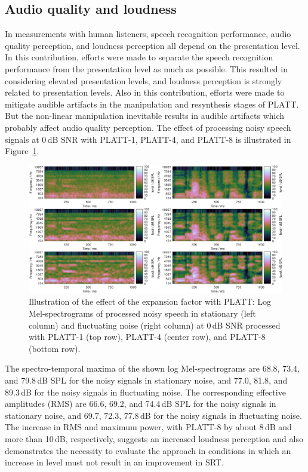 \documentclass[10pt,a4paper,twocolumn]{article}
\begin{document}
\subsection*{Audio quality and loudness}
%
In measurements with human listeners, speech recognition performance, audio quality perception, and loudness perception all depend on the presentation level.
%
In this contribution, efforts were made to separate the speech recognition performance from the presentation level as much as possible.
%
This resulted in considering elevated presentation levels, and loudness perception is strongly related to presentation levels.
%
Also in this contribution, efforts were made to mitigate audible artifacts in the manipulation and resynthesis stages of PLATT.
%
But the non-linear manipulation inevitable results in audible artifacts which probably affect audio quality perception.
%
The effect of processing noisy speech signals at 0\,dB SNR with PLATT-1, PLATT-4, and PLATT-8 is illustrated in Figure~\ref{fig:22}.
%
\begin{figure}[h!]
	\centerline{\includegraphics[width=1.0\textwidth]{images/signal-platt-processed}}
	\caption{Illustration of the effect of the expansion factor with PLATT: Log Mel-spectrograms of processed noisy speech in stationary (left column) and fluctuating noise (right column) at 0\,dB SNR processed with PLATT-1 (top row), PLATT-4 (center row), and PLATT-8 (bottom row).}
	\label{fig:22}
\end{figure}
%
The spectro-temporal maxima of the shown log Mel-spectrograms are 68.8, 73.4, and 79.8\,dB SPL for the noisy signals in stationary noise, and 77.0, 81.8, and 89.3\,dB for the noisy signals in fluctuating noise.
%
The corresponding effective amplitudes (RMS) are 66.6, 69.2, and 74.4\,dB SPL for the noisy signals in stationary noise, and 69.7, 72.3, 77.8\,dB for the noisy signals in fluctuating noise.
%
The increase in RMS and maximum power, with PLATT-8 by about 8\,dB and more than 10\,dB, respectively, suggests an increased loudness perception and also demonstrates the necessity to evaluate the approach in conditions in which an increase in level must not result in an improvement in SRT.
\end{document}
